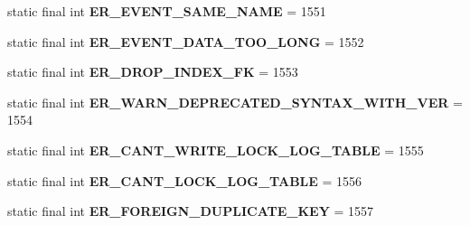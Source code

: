 \begin{DoxyCompactItemize}
static final int {\bfseries E\+R\+\_\+\+E\+V\+E\+N\+T\+\_\+\+S\+A\+M\+E\+\_\+\+N\+A\+ME} = 1551
\item 
\mbox{\label{classcom_1_1mysql_1_1cj_1_1exceptions_1_1_mysql_error_numbers_a54b33fc4700743ef79e2ccee86ffde1b}} 
static final int {\bfseries E\+R\+\_\+\+E\+V\+E\+N\+T\+\_\+\+D\+A\+T\+A\+\_\+\+T\+O\+O\+\_\+\+L\+O\+NG} = 1552
\item 
\mbox{\label{classcom_1_1mysql_1_1cj_1_1exceptions_1_1_mysql_error_numbers_af2a070e4853bd7c88f9be289cf70e20e}} 
static final int {\bfseries E\+R\+\_\+\+D\+R\+O\+P\+\_\+\+I\+N\+D\+E\+X\+\_\+\+FK} = 1553
\item 
\mbox{\label{classcom_1_1mysql_1_1cj_1_1exceptions_1_1_mysql_error_numbers_a05ee7354cca0c3be2a65e1a991fb9b4e}} 
static final int {\bfseries E\+R\+\_\+\+W\+A\+R\+N\+\_\+\+D\+E\+P\+R\+E\+C\+A\+T\+E\+D\+\_\+\+S\+Y\+N\+T\+A\+X\+\_\+\+W\+I\+T\+H\+\_\+\+V\+ER} = 1554
\item 
\mbox{\label{classcom_1_1mysql_1_1cj_1_1exceptions_1_1_mysql_error_numbers_a8400864a5581ae189403c51bd736fb69}} 
static final int {\bfseries E\+R\+\_\+\+C\+A\+N\+T\+\_\+\+W\+R\+I\+T\+E\+\_\+\+L\+O\+C\+K\+\_\+\+L\+O\+G\+\_\+\+T\+A\+B\+LE} = 1555
\item 
\mbox{\label{classcom_1_1mysql_1_1cj_1_1exceptions_1_1_mysql_error_numbers_a8cb9b5385d10b44e0bb68faff69c17db}} 
static final int {\bfseries E\+R\+\_\+\+C\+A\+N\+T\+\_\+\+L\+O\+C\+K\+\_\+\+L\+O\+G\+\_\+\+T\+A\+B\+LE} = 1556
\item 
\mbox{\label{classcom_1_1mysql_1_1cj_1_1exceptions_1_1_mysql_error_numbers_ad1a241c9250051a4393e47a16062666c}} 
static final int {\bfseries E\+R\+\_\+\+F\+O\+R\+E\+I\+G\+N\+\_\+\+D\+U\+P\+L\+I\+C\+A\+T\+E\+\_\+\+K\+EY} = 1557
\item 
\mbox{\label{classcom_1_1mysql_1_1cj_1_1exceptions_1_1_mysql_error_numbers_abe5b9ea1c3070185c1b4ad66cd378cbc}} 

\end{DoxyCompactItemize}
